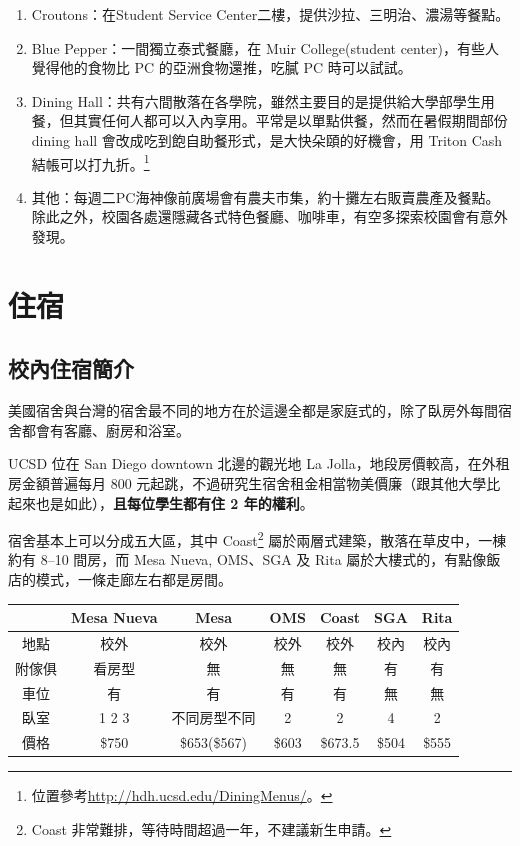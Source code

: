 \documentclass[10pt,a4paper]{book}
\begin{document}
\begin{CJK}{UTF8}{bkai}
\begin{enumerate}
\item Croutons：在Student Service Center二樓，提供沙拉、三明治、濃湯等餐點。

\item Blue Pepper：一間獨立泰式餐廳，在 Muir College(student center)，有些人覺得他的食物比 PC 的亞洲食物還推，吃膩 PC 時可以試試。

\item Dining Hall：共有六間散落在各學院，雖然主要目的是提供給大學部學生用餐，但其實任何人都可以入內享用。平常是以單點供餐，然而在暑假期間部份 dining hall 會改成吃到飽自助餐形式，是大快朵頤的好機會，用 Triton Cash 結帳可以打九折。\footnote{位置參考\url{http://hdh.ucsd.edu/DiningMenus/}。}
\item 其他：每週二PC海神像前廣場會有農夫市集，約十攤左右販賣農產及餐點。除此之外，校園各處還隱藏各式特色餐廳、咖啡車，有空多探索校園會有意外發現。
\end{enumerate}

\section{住宿}
\label{sec:housing}
\subsection{校內住宿簡介}
美國宿舍與台灣的宿舍最不同的地方在於這邊全都是家庭式的，除了臥房外每間宿舍都會有客廳、廚房和浴室。

UCSD 位在 San Diego downtown 北邊的觀光地 La Jolla，地段房價較高，在外租房金額普遍每月 800 元起跳，不過研究生宿舍租金相當物美價廉（跟其他大學比起來也是如此），\textbf{且每位學生都有住 2 年的權利}。

宿舍基本上可以分成五大區，其中 Coast\footnote{Coast 非常難排，等待時間超過一年，不建議新生申請。} 屬於兩層式建築，散落在草皮中，一棟約有 8--10 間房，而 Mesa Nueva, OMS、SGA 及 Rita 屬於大樓式的，有點像飯店的模式，一條走廊左右都是房間。

\begin{center}
\begin{tabular}{c c c c c c c}
\hline
 & Mesa Nueva & Mesa & OMS & Coast & SGA & Rita \\
\hline
地點 & 校外 & 校外 & 校外 & 校外 & 校內 & 校內\\
附傢俱 & 看房型 & 無 & 無 & 無 & 有 & 有\\
車位 & 有 & 有 & 有 & 有 & 無 & 無\\
臥室 & 1 2 3 & 不同房型不同 & 2 & 2 & 4 & 2 \\
價格 & \$750 & \$653(\$567) & \$603 & \$673.5 & \$504 & \$555\\
\hline
\end{tabular}
\end{center}


\end{CJK}
\end{document}
